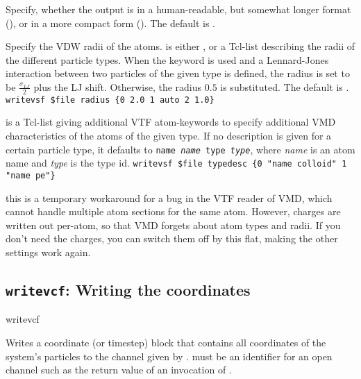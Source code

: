 \begin{arguments}
\item[\opt{\alt{short \asep verbose}}]
  Specify, whether the output is in a human-readable, but somewhat
  longer format (), or in a more compact form
  (). The default is .
  
\item[\opt{radius \alt{\var{radii} \asep auto}}] Specify the VDW radii
  of the atoms.  is either , or a Tcl-list
  describing the radii of the different particle types. When the
  keyword  is used and a Lennard-Jones interaction
  between two particles of the given type is defined, the radius is
  set to be $\frac{\sigma_{LJ}}{2}$ plus the LJ shift.  Otherwise, the
  radius $0.5$ is substituted. The default is .
  \verb!writevsf $file radius {0 2.0 1 auto 2 1.0}!

\item[\opt{typedesc \var{typedesc}}]
   is a Tcl-list giving additional VTF atom-keywords to
  specify additional VMD characteristics of the atoms of the given type.
  If no description is given for a certain particle type, it defaults to
  \texttt{name \textit{name} type \textit{type}}, where \textit{name}
  is an atom name and \textit{type} is the type id.
  \verb!writevsf $file typedesc {0 "name colloid" 1 "name pe"}!
\item[\opt{ignore_charges}]
  this is a temporary workaround for a bug in the VTF reader of VMD,
  which cannot handle multiple atom sections for the same
  atom. However, charges are written out per-atom, so that VMD forgets
  about atom types and radii. If you don't need the charges, you can
  switch them off by this flat, making the other settings work again.
\end{arguments}

\subsection{\texttt{writevcf}: Writing  the coordinates}

\begin{essyntax}
  writevcf  
\end{essyntax}
Writes a coordinate (or timestep) block that contains all coordinates
of the system's particles to the channel given by .
 must be an identifier for an open channel such as the
return value of an invocation of .

